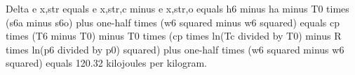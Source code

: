 Delta e x,str equals e x,str,c minus e x,str,o equals h6 minus ha minus T0 times (s6a minus s6o) plus one-half times (w6 squared minus w6 squared) equals cp times (T6 minus T0) minus T0 times (cp times ln(Tc divided by T0) minus R times ln(p6 divided by p0) squared) plus one-half times (w6 squared minus w6 squared) equals 120.32 kilojoules per kilogram.